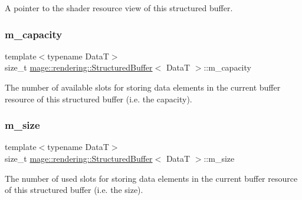 A pointer to the shader resource view of this structured buffer. \hypertarget{classmage_1_1rendering_1_1_structured_buffer_a0251edd40d14732396952db2c0970fbf}{}\label{classmage_1_1rendering_1_1_structured_buffer_a0251edd40d14732396952db2c0970fbf} 
\subsubsection{\texorpdfstring{m\+\_\+capacity}{m\_capacity}}
{\footnotesize\ttfamily template$<$typename DataT$>$ \\
size\+\_\+t \hyperlink{classmage_1_1rendering_1_1_structured_buffer}{mage\+::rendering\+::\+Structured\+Buffer}$<$ DataT $>$\+::m\+\_\+capacity\hspace{0.3cm}{\ttfamily [private]}}

The number of available slots for storing data elements in the current buffer resource of this structured buffer (i.\+e. the capacity). \hypertarget{classmage_1_1rendering_1_1_structured_buffer_a6985fe51dee8a1539994230f062a21ef}{}\label{classmage_1_1rendering_1_1_structured_buffer_a6985fe51dee8a1539994230f062a21ef} 
\subsubsection{\texorpdfstring{m\+\_\+size}{m\_size}}
{\footnotesize\ttfamily template$<$typename DataT$>$ \\
size\+\_\+t \hyperlink{classmage_1_1rendering_1_1_structured_buffer}{mage\+::rendering\+::\+Structured\+Buffer}$<$ DataT $>$\+::m\+\_\+size\hspace{0.3cm}{\ttfamily [private]}}

The number of used slots for storing data elements in the current buffer resource of this structured buffer (i.\+e. the size). 